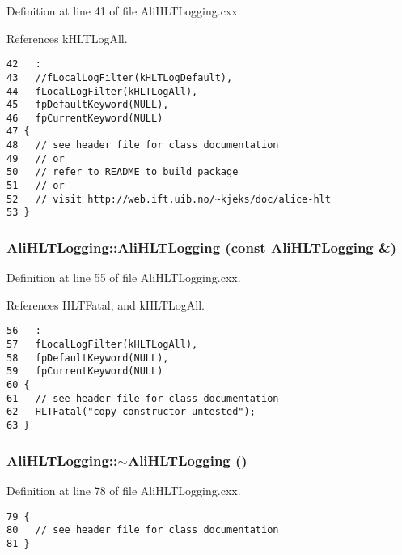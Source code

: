 Definition at line 41 of file Ali\-HLTLogging.cxx.

References k\-HLTLog\-All.

\footnotesize\begin{verbatim}42   :
43   //fLocalLogFilter(kHLTLogDefault),
44   fLocalLogFilter(kHLTLogAll),
45   fpDefaultKeyword(NULL),
46   fpCurrentKeyword(NULL)
47 {
48   // see header file for class documentation
49   // or
50   // refer to README to build package
51   // or
52   // visit http://web.ift.uib.no/~kjeks/doc/alice-hlt
53 }

\end{verbatim}\normalsize 


\subsubsection{\setlength{\rightskip}{0pt plus 5cm}Ali\-HLTLogging::Ali\-HLTLogging (const {\bf Ali\-HLTLogging} \&)}\label{classAliHLTLogging_a1}




Definition at line 55 of file Ali\-HLTLogging.cxx.

References HLTFatal, and k\-HLTLog\-All.

\footnotesize\begin{verbatim}56   :
57   fLocalLogFilter(kHLTLogAll),
58   fpDefaultKeyword(NULL),
59   fpCurrentKeyword(NULL)
60 {
61   // see header file for class documentation
62   HLTFatal("copy constructor untested");
63 }

\end{verbatim}\normalsize 


\subsubsection{\setlength{\rightskip}{0pt plus 5cm}Ali\-HLTLogging::$\sim${\bf Ali\-HLTLogging} ()\hspace{0.3cm}{\tt  [virtual]}}\label{classAliHLTLogging_a3}




Definition at line 78 of file Ali\-HLTLogging.cxx.

\footnotesize\begin{verbatim}79 {
80   // see header file for class documentation
81 }
\end{verbatim}\normalsize 




